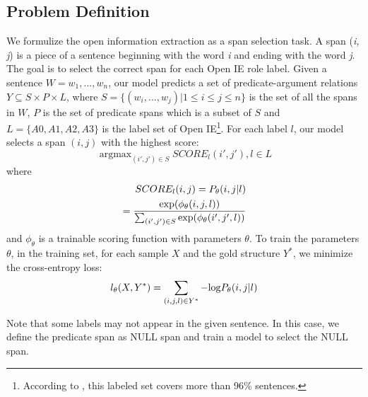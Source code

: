 \documentclass[letterpaper]{article} %
\begin{document}
\subsection{Problem Definition}
We formulize the open information extraction as a span selection task. A span (\textit{i, j}) is a piece of a sentence beginning with the word \textit{i} and ending with the word \textit{j}. The goal is to select the correct span for each Open IE role label. Given a sentence $W=w_1,...,w_n$, our model predicts a set of predicate-argument relations $Y \subseteq  S \times P \times L$, where $S=\{(w_i,...,w_j)|1\leq i \leq j \leq n\}$ is the set of all the spans in $W$, $P$ is the set of predicate spans which is a subset of $S$ and $L=\{A0, A1, A2, A3\}$ is the label set of Open IE\footnote{According to \cite{Stanovsky2018SupervisedOI}, this labeled set covers more than 96\% sentences.}. For each label $l$, our model selects a span $(i,j)$ with the highest score:
\begin{equation}
    \mathop{\arg\max}_{(i',j')\in S} SCORE_l (i',j'), l \in L
\end{equation}
where
\begin{equation}
    \begin{split}
      SCORE_l (i,j)= P_{\theta}(i,j|l) \\ = \frac{{\rm exp}(\phi_\theta (i,j,l))}{\sum_{(i',j') \in S} {\rm exp}(\phi_\theta (i',j',l))}  
    \end{split}
\end{equation}
and $\phi_\theta$ is a trainable scoring function with parameters $\theta$. To train the parameters $\theta$, in the training set, for each sample $X$ and the gold structure $Y^*$, we minimize the cross-entropy loss:
\begin{equation}\label{loss}
    l_\theta(X,Y^*)=\sum_{(i,j,l)\in Y^*} -{\rm log} P_{\theta}(i,j|l)
\end{equation}

Note that some labels may not appear in the given sentence. In this case, we define the predicate span as NULL span and train a model to select the NULL span.
\end{document}
